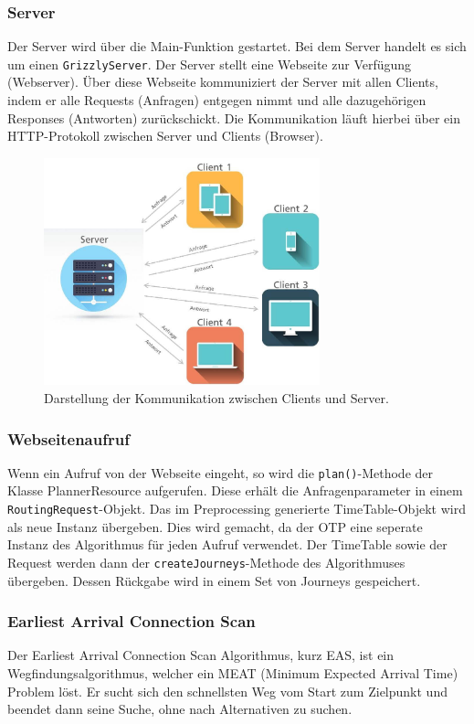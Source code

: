 \subsubsection{Server}
Der Server wird über die Main-Funktion gestartet. Bei dem Server handelt es sich um einen \texttt{GrizzlyServer}. Der Server stellt eine Webseite zur Verfügung (Webserver). Über diese Webseite kommuniziert der Server mit allen Clients, indem er alle Requests (Anfragen) entgegen nimmt und alle dazugehörigen Responses (Antworten) zurückschickt. Die Kommunikation läuft hierbei über ein HTTP-Protokoll zwischen Server und Clients (Browser). 

\begin{figure}[htb]
	\centering
	\includegraphics[width=8cm]{img/serverrequestresponse.jpg}
	\caption{Darstellung der Kommunikation zwischen Clients und Server\cite{server-pic}.}
	\label{fig:serverrequestresponse}
\end{figure}




\subsubsection{Webseitenaufruf}
Wenn ein Aufruf von der Webseite eingeht, so wird die \texttt{plan()}-Methode der Klasse PlannerResource aufgerufen. Diese erhält die Anfragenparameter in einem \texttt{RoutingRequest}-Objekt. Das im Preprocessing generierte TimeTable-Objekt wird als neue Instanz übergeben. Dies wird gemacht, da der OTP eine seperate Instanz des Algorithmus für jeden Aufruf verwendet. Der TimeTable sowie der Request werden dann der \texttt{createJourneys}-Methode des Algorithmuses übergeben. Dessen Rückgabe wird in einem Set von Journeys gespeichert.


\subsubsection{Earliest Arrival Connection Scan}
Der \hypertarget{EAS}{Earliest Arrival Connection Scan Algorithmus}\cite{csa}, kurz EAS, ist ein Wegfindungsalgorithmus, welcher ein \gls{MEAT} (Minimum Expected Arrival Time) Problem löst. Er sucht sich den schnellsten Weg vom Start zum Zielpunkt und beendet dann seine Suche, ohne nach Alternativen zu suchen. \newline

